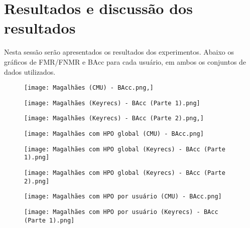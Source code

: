 \section{Resultados e discussão dos resultados}\label{sec:resultados}

Nesta sessão serão apresentados os resultados dos experimentos. Abaixo os gráficos de FMR/FNMR e BAcc para cada usuário, em ambos os conjuntos de dados utilizados.


\begin{figure}[H]
    \caption{}
    \label{fig:st_bacc_cmu}
    \centering
    \texttt{[image: Magalhães (CMU) - BAcc.png,]}
\end{figure}
\begin{figure}[H]
    \caption{}
    \label{fig:st_bacc_keyrecs_1}
    \centering
    \texttt{[image: Magalhães (Keyrecs) - BAcc (Parte 1).png]}              
\end{figure}
\begin{figure}[H]
    \caption{}
    \label{fig:st_bacc_keyrecs_2}
    \centering
    \texttt{[image: Magalhães (Keyrecs) - BAcc (Parte 2).png,]}
\end{figure}
\begin{figure}[H]
    \caption{}
    \label{fig:st_global_bacc_cmu}
    \centering
    \texttt{[image: Magalhães com HPO global (CMU) - BAcc.png]}
\end{figure}
\begin{figure}[H]
    \caption{}
    \label{fig:st_global_keyrecs_bacc_1}
    \centering
    \texttt{[image: Magalhães com HPO global (Keyrecs) - BAcc (Parte 1).png]}
\end{figure}
\begin{figure}[H]
    \caption{}
    \label{fig:fig:st_global_keyrecs_bacc_2}
    \centering
    \texttt{[image: Magalhães com HPO global (Keyrecs) - BAcc (Parte 2).png]}
\end{figure}
\begin{figure}[H]
    \caption{}
    \label{fig:st_user_cmu_bacc}
    \centering
    \texttt{[image: Magalhães com HPO por usuário (CMU) - BAcc.png]}
\end{figure}
\begin{figure}[H]
    \caption{}
    \label{fig:st_user_keyrecs_bacc_1}
    \centering
    \texttt{[image: Magalhães com HPO por usuário (Keyrecs) - BAcc (Parte 1).png]}
\end{figure}

